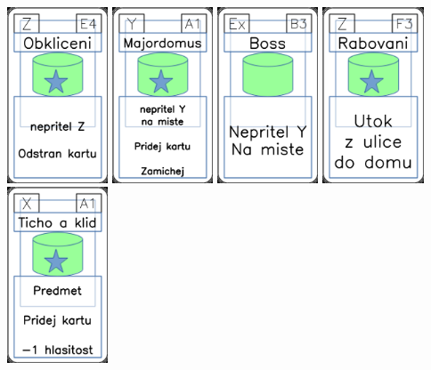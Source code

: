 \documentclass[a4paper]{article}
\begin{document}
	\includegraphics[width=3.0cm]{img-5_53}
	\includegraphics[width=3.0cm]{img-5_30}
	\includegraphics[width=3.0cm]{img-4_7}
	\includegraphics[width=3.0cm]{img-5_57}
	\includegraphics[width=3.0cm]{img-5_0}
\end{document}
